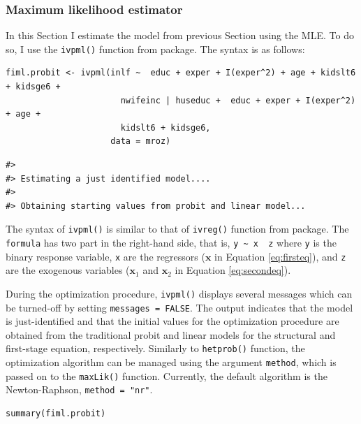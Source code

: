 \hypertarget{maximum-likelihood-estimator}{%
\subsubsection{Maximum likelihood estimator}\label{maximum-likelihood-estimator}}

In this Section I estimate the model from previous Section using the MLE. To do so, I use the \texttt{ivpml()} function from  package. The syntax is as follows:

\begin{verbatim}
fiml.probit <- ivpml(inlf ~  educ + exper + I(exper^2) + age + kidslt6 + kidsge6 + 
                       nwifeinc | huseduc +  educ + exper + I(exper^2) + age + 
                       kidslt6 + kidsge6, 
                     data = mroz)
\end{verbatim}

\begin{verbatim}
#> 
#> Estimating a just identified model....
#> 
#> Obtaining starting values from probit and linear model...
\end{verbatim}

The syntax of \texttt{ivpml()} is similar to that of \texttt{ivreg()} function from  package. The \texttt{formula} has two part in the right-hand side, that is, \texttt{y\ \textasciitilde{}\ x\ \textbar{}\ z} where \texttt{y} is the binary response variable, \texttt{x} are the regressors (\(\mathbf x\) in Equation \eqref{eq:firsteq}), and \texttt{z} are the exogenous variables (\(\mathbf x_1\) and \(\mathbf x_2\) in Equation \eqref{eq:secondeq}).

During the optimization procedure, \texttt{ivpml()} displays several messages which can be turned-off by setting \texttt{messages\ =\ FALSE}. The output indicates that the model is just-identified and that the initial values for the optimization procedure are obtained from the traditional probit and linear models for the structural and first-stage equation, respectively. Similarly to \texttt{hetprob()} function, the optimization algorithm can be managed using the argument \texttt{method}, which is passed on to the \texttt{maxLik()} function. Currently, the default algorithm is the Newton-Raphson, \texttt{method\ =\ "nr"}.

\begin{verbatim}
summary(fiml.probit)
\end{verbatim}


